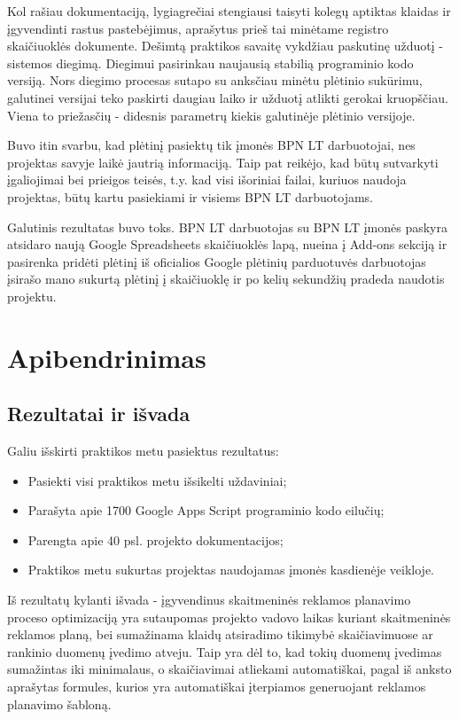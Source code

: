 \documentclass{VUMIFPSkursinis}
\begin{document}
Kol rašiau dokumentaciją, lygiagrečiai stengiausi taisyti kolegų aptiktas klaidas ir įgyvendinti rastus pastebėjimus, aprašytus prieš tai minėtame registro skaičiuoklės dokumente. Dešimtą praktikos savaitę vykdžiau paskutinę užduotį - sistemos diegimą. Diegimui pasirinkau naujausią stabilią programinio kodo versiją. Nors diegimo procesas sutapo su anksčiau minėtu plėtinio sukūrimu, galutinei versijai teko paskirti daugiau laiko ir užduotį atlikti gerokai kruopščiau. Viena to priežasčių - didesnis parametrų kiekis galutinėje plėtinio versijoje. 

Buvo itin svarbu, kad plėtinį pasiektų tik įmonės BPN LT darbuotojai, nes projektas savyje laikė jautrią informaciją. Taip pat reikėjo, kad būtų sutvarkyti įgaliojimai bei prieigos teisės, t.y. kad visi išoriniai failai, kuriuos naudoja projektas, būtų kartu pasiekiami ir visiems BPN LT darbuotojams. 

Galutinis rezultatas buvo toks. BPN LT darbuotojas su BPN LT įmonės paskyra atsidaro naują Google Spreadsheets skaičiuoklės lapą, nueina į Add-ons sekciją ir pasirenka pridėti plėtinį iš oficialios Google plėtinių parduotuvės darbuotojas įsirašo mano sukurtą plėtinį į skaičiuoklę ir po kelių sekundžių pradeda naudotis projektu.

\section{Apibendrinimas}

\subsection{Rezultatai ir išvada}

Galiu išskirti praktikos metu pasiektus rezultatus:
\begin{itemize}
    \item Pasiekti visi praktikos metu išsikelti uždaviniai;
    \item Parašyta apie 1700 Google Apps Script programinio kodo eilučių;
    \item Parengta apie 40 psl. projekto dokumentacijos;
    \item Praktikos metu sukurtas projektas naudojamas įmonės kasdienėje veikloje.
\end{itemize}
\bigskip

Iš rezultatų kylanti išvada - įgyvendinus skaitmeninės reklamos planavimo proceso optimizaciją yra sutaupomas projekto vadovo laikas kuriant skaitmeninės reklamos planą, bei sumažinama klaidų atsiradimo tikimybė skaičiavimuose ar rankinio duomenų įvedimo atveju. Taip yra dėl to, kad tokių duomenų įvedimas sumažintas iki minimalaus, o skaičiavimai atliekami automatiškai, pagal iš anksto aprašytas formules, kurios yra automatiškai įterpiamos generuojant reklamos planavimo šabloną.
\end{document}
